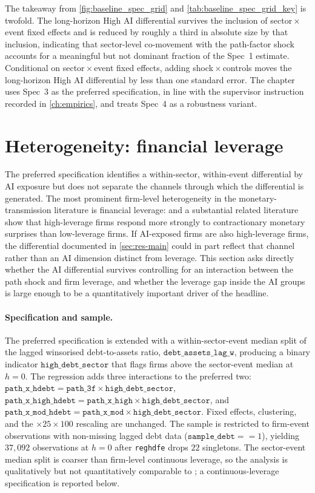 The takeaway from \cref{fig:baseline_spec_grid} and
\cref{tab:baseline_spec_grid_key} is twofold. The long-horizon High AI
differential survives the inclusion of sector\,$\times$\,event fixed
effects and is reduced by roughly a third in absolute size by that
inclusion, indicating that sector-level co-movement with the path-factor
shock accounts for a meaningful but not dominant fraction of the Spec~1
estimate. Conditional on sector\,$\times$\,event fixed effects, adding
shock\,$\times$\,controls moves the long-horizon High AI differential by
less than one standard error. The chapter uses Spec~3 as the preferred
specification, in line with the supervisor instruction recorded in
\cref{ch:empirics}, and treats Spec~4 as a robustness variant.

\section{Heterogeneity: financial leverage}
\label{sec:res-heterogeneity}
 
The preferred specification identifies a within-sector, within-event
differential by AI exposure but does not separate the channels
through which the differential is generated. The most prominent
firm-level heterogeneity in the monetary-transmission literature is
financial leverage: \citet{ottonelloWinberry2020} and a substantial
related literature show that high-leverage firms respond more
strongly to contractionary monetary surprises than low-leverage
firms. If AI-exposed firms are also high-leverage firms, the
differential documented in \cref{sec:res-main} could in part reflect
that channel rather than an AI dimension distinct from leverage.
This section asks directly whether the AI differential survives
controlling for an interaction between the path shock and firm
leverage, and whether the leverage gap inside the AI groups is
large enough to be a quantitatively important driver of the
headline.
 
\paragraph{Specification and sample.} The preferred specification is
extended with a within-sector-event median split of the lagged
winsorised debt-to-assets ratio, $\texttt{debt\_assets\_lag\_w}$,
producing a binary indicator $\texttt{high\_debt\_sector}$ that
flags firms above the sector-event median at $h = 0$. The regression
adds three interactions to the preferred two:
$\texttt{path\_x\_hdebt} = \texttt{path\_3f} \times
\texttt{high\_debt\_sector}$, $\texttt{path\_x\_high\_hdebt} =
\texttt{path\_x\_high} \times \texttt{high\_debt\_sector}$, and
$\texttt{path\_x\_mod\_hdebt} = \texttt{path\_x\_mod} \times
\texttt{high\_debt\_sector}$. Fixed effects, clustering, and the
$\times 25 \times 100$ rescaling are unchanged. The sample is
restricted to firm-event observations with non-missing lagged debt
data ($\texttt{sample\_debt} == 1$), yielding $37{,}092$ observations
at $h = 0$ after \texttt{reghdfe} drops $22$ singletons. The
sector-event median split is coarser than firm-level continuous
leverage, so the analysis is qualitatively but not quantitatively
comparable to \citet{ottonelloWinberry2020}; a continuous-leverage
specification is reported below.
 
